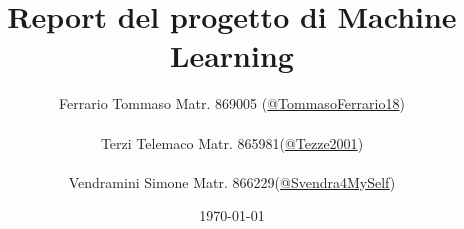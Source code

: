\documentclass[a4paper,15pt, oneside]{report}
\title{Report del progetto di Machine Learning}
\author{Ferrario Tommaso Matr. 869005 (\href{https://github.com/TommasoFerrario18}{@TommasoFerrario18}) \\\\
Terzi Telemaco Matr. 865981(\href{https://github.com/Tezze2001}{@Tezze2001}) \\\\
Vendramini Simone Matr. 866229(\href{https://github.com/simone-vendramini}{@Svendra4MySelf})}
\date{\today}
\begin{document}
\maketitle

\tableofcontents
\renewcommand{\chaptermark}[1]{
  \markboth{\chaptername
    \ \thechapter.\ #1}{}}
\renewcommand{\sectionmark}[1]{\markright{\thesection.\ #1}}







\end{document}
